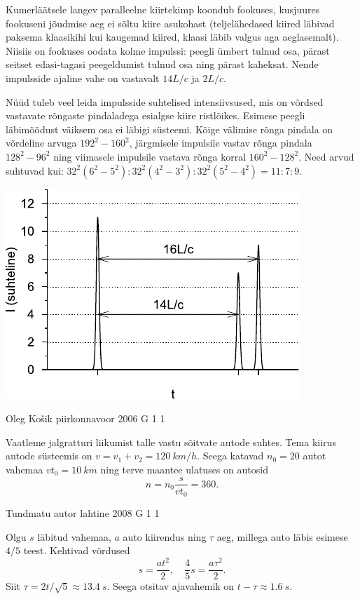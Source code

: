 \documentclass[11pt, twoside]{article}
\begin{document}
{{Kumerläätsele langev paralleelne kiirtekimp koondub fookuses, kusjuures fookuseni jõudmise aeg ei sõltu kiire asukohast (teljelähedased kiired läbivad paksema klaasikihi kui kaugemad kiired, klaasi läbib valgus aga aeglasemalt). Niisiis on fookuses oodata kolme impulssi: peegli ümbert tulnud osa, pärast seitset edasi-tagasi peegeldumist tulnud osa ning pärast kaheksat. Nende impulsside ajaline vahe on vastavalt $14L/c$ ja $2L/c$.

Nüüd tuleb veel leida impulsside suhtelised intensiivsused, mis on võrdsed vastavate rõngaste pindaladega esialgse kiire ristlõikes. Esimese peegli läbimõõdust väiksem osa ei läbigi süsteemi. Kõige välimise rõnga pindala on võrdeline arvuga $192^2 - 160^2$, järgmisele impulsile vastav rõnga pindala $128^2 - 96^2$ ning viimasele impulsile vastava rõnga korral $160^2 - 128^2$. Need arvud suhtuvad kui: $32^2(6^2 - 5^2) : 32^2 (4^2 - 3^2) : 32^2 (5^2 - 4^2) = 11 : 7 : 9$.

\begin{center}
	\includegraphics[width=0.6\linewidth]{2006-v3g-09-lah}
\end{center}
\fi
}

{Oleg Košik} %
{piirkonnavoor} %
{2006} %
{G 1} %
{1} %
{

\ifSolution
Vaatleme jalgratturi liikumist talle vastu sõitvate autode suhtes. Tema kiirus autode süsteemis on $v = v_1 + v_2 = \SI{120}{km/h}$. Seega katavad $n_0 = 20$ autot vahemaa $vt_0 = \SI{10}{km}$ ning terve maantee ulatuses on autosid
\[
n = n_0 \frac{s}{vt_0} = \num{360}. 
\]
\fi
}

{Tundmatu autor} %
{lahtine} %
{2008} %
{G 1} %
{1} %
{

\ifSolution
Olgu $s$ läbitud vahemaa, $a$ auto kiirendus ning $\tau$ aeg, millega auto läbis esimese $4/5$ teest. Kehtivad võrdused
\[
s=\frac{a t^{2}}{2}, \quad \frac{4}{5} s=\frac{a \tau^{2}}{2}.
\]
Siit $\tau = 2t/\sqrt 5\approx \SI{13,4}{s}$. Seega otsitav ajavahemik on $t-\tau\approx \SI{1,6}{s}$.
\fi
}

}
\end{document}
